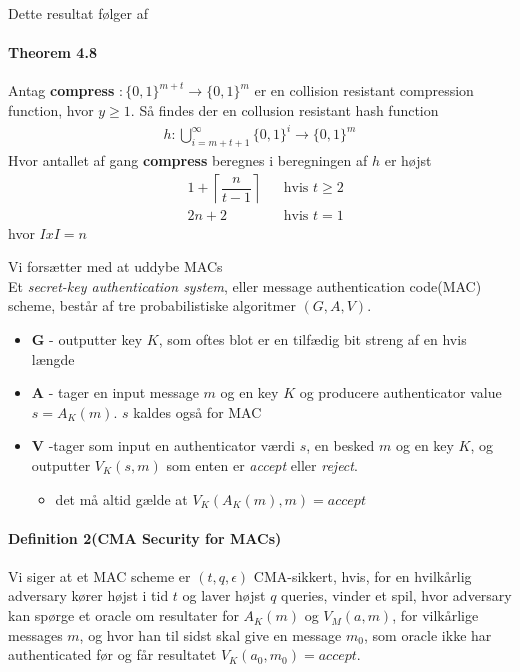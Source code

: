 \documentclass[paper=a4, fontsize=11pt]{scrartcl} %
\numberwithin{equation}{section} %
\numberwithin{figure}{section} %
\numberwithin{table}{section} %
\begin{document}
	Dette resultat følger af 
	
	\paragraph{\textbf{Theorem 4.8}} Antag \textbf{compress} $:\{0,1\}^{m+t}\rightarrow\{0,1\}^m$ er en collision resistant compression function, hvor $y\geq 1$. Så findes der en collusion resistant hash function
	\begin{align*}
	h:\bigcup^{\infty}_{i=m+t+1}\{0,1\}^i\rightarrow \{0,1\}^m
	\end{align*}
	Hvor antallet af gang \textbf{compress} beregnes i beregningen af $h$ er højst
	\begin{align*}
	& 1+\left\lceil\dfrac{n}{t-1}\right\rceil && \text{hvis } t\geq2 \\
	& 2n+2  && \text{hvis } t=1
	\end{align*}
	hvor $IxI=n$
	
	Vi forsætter med at uddybe MACs \\
	
	Et \textit{secret-key authentication system}, eller message authentication code(MAC) scheme, består af tre probabilistiske algoritmer $(G,A,V)$. 
	\begin{itemize}
		\item \textbf{G} - outputter key $K$, som oftes blot er en tilfædig bit streng af en hvis længde
		\item \textbf{A} - tager en input message $m$ og en key $K$ og producere authenticator value $s=A_K(m)$. $s$ kaldes også for MAC
		\item \textbf{V} -tager som input en authenticator værdi $s$, en besked $m$ og en key $K$, og outputter $V_K(s,m)$ som enten er \textit{accept} eller \textit{reject}.
		\begin{itemize}
			\item det må altid gælde at $V_K(A_K(m),m)=accept$
		\end{itemize}
	\end{itemize}
	
	\paragraph{\textbf{Definition 2(CMA Security for MACs)}} Vi siger at et MAC scheme er $(t,q,\epsilon)$ CMA-sikkert, hvis, for en hvilkårlig adversary kører højst i tid $t$ og laver højst $q$ queries, vinder et spil, hvor adversary kan spørge et oracle om resultater for $A_K(m)$ og $V_M(a,m)$, for vilkårlige messages $m$, og hvor han til sidst skal give en message $m_0$, som oracle ikke har authenticated før og får resultatet $V_K(a_0,m_0)=accept$.
	
\end{document}
